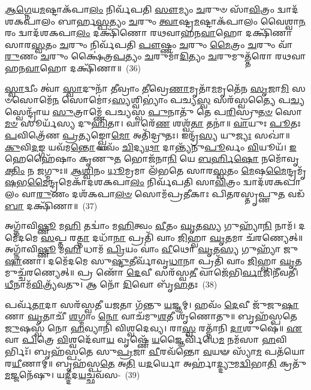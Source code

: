 {\anuvakamend[{\-\ul{𑌆}\-\-\ul{𑌗𑍍𑌨𑍇}\-𑌯𑍞 \ul{𑌸}\-𑌪𑍍𑌤𑌚᳴𑌤𑍍𑌵𑌾𑌰𑌿𑍞𑌶𑌤𑍍}]}%

\-\ul{𑌆}\-\-\ul{𑌗𑍍𑌨𑍇}\-𑌯\-\ul{𑌮}\-𑌷𑍍𑌟𑌾\-𑌕᳴𑌪𑌾\-\ul{𑌲𑌂} 𑌨𑌿𑌰𑍍𑌵᳴𑌪𑌤𑌿 \ul{𑌸𑍗}\-𑌮𑍍𑌯𑌂 \ul{𑌚}\-𑌰𑍁𑍞 𑌸𑌾᳴\-\ul{𑌵𑌿}\-𑌤𑍍𑌰𑌂 𑌦𑍍𑌵𑌾𑌦᳴𑌶\-𑌕𑌪𑌾𑌲𑌂 𑌬𑌾𑌰𑍍\mbox{}𑌹\-\ul{𑌸𑍍𑌪}\-𑌤𑍍𑌯𑌂 \ul{𑌚}\-𑌰𑍁𑌂 \ul{𑌤𑍍𑌵𑌾}\-𑌷𑍍𑌟𑍍𑌰\-\ul{𑌮}\-𑌷𑍍𑌟𑌾𑌕᳴𑌪𑌾𑌲𑌂 𑌵𑍈𑌶𑍍𑌵𑌾\-\ul{𑌨}\-𑌰𑌂 𑌦𑍍𑌵𑌾𑌦᳴𑌶\-𑌕𑌪𑌾\-\ul{𑌲𑌂} 𑌦𑌕𑍍𑌷𑌿᳴𑌣𑍋 𑌰𑌥𑌵𑌾𑌹𑌨\-\ul{𑌵𑌾}\-𑌹𑍋 𑌦𑌕𑍍𑌷𑌿᳴𑌣𑌾 𑌸𑌾𑌰\-\ul{𑌸𑍍𑌵}\-𑌤𑌂 \ul{𑌚}\-𑌰𑍁𑌂 𑌨𑌿𑌰𑍍𑌵᳴𑌪𑌤𑌿 \ul{𑌪𑍗}\-𑌷𑍍𑌣𑌂 \ul{𑌚}\-𑌰𑍁𑌂 \ul{𑌮𑍈}\-𑌤𑍍𑌰𑌂 \ul{𑌚}\-𑌰𑍁𑌂 𑌵𑌾᳴\-\ul{𑌰𑍁}\-𑌣𑌂 \ul{𑌚}\-𑌰𑍁𑌂 𑌕𑍍𑌷𑍈॑𑌤𑍍𑌰\-\ul{𑌪}\-𑌤𑍍𑌯𑌂 \ul{𑌚}\-𑌰𑍁𑌮𑌾᳴\-\ul{𑌦𑌿}\-𑌤𑍍𑌯𑌂 \ul{𑌚}\-𑌰𑍁𑌮𑍁𑌤𑍍𑌤᳴𑌰𑍋 𑌰𑌥𑌵𑌾𑌹𑌨\-\ul{𑌵𑌾}\-𑌹𑍋 𑌦𑌕𑍍𑌷𑌿᳴𑌣𑌾॥~(36)

{\anuvakamend[{\-\ul{𑌆}\-\-\ul{𑌗𑍍𑌨𑍇}\-𑌯𑌂 𑌚𑌤𑍁᳴𑌸𑍍𑌤𑍍𑌰𑌿𑍞𑌶𑌤𑍍}]}%

\-\ul{𑌸𑍍𑌵𑌾}\-𑌦𑍍𑌵𑍀𑌂 𑌤𑍍𑌵𑌾॑ \ul{𑌸𑍍𑌵𑌾}\-𑌦𑍁𑌨𑌾᳴ \ul{𑌤𑍀}\-𑌵𑍍𑌰𑌾𑌂 \ul{𑌤𑍀}\-𑌵𑍍𑌰𑍇\-\ul{𑌣𑌾}\-𑌮𑍃𑌤𑌾᳴\-\ul{𑌮}\-𑌮𑍃𑌤𑍇᳴𑌨 \ul{𑌸𑍃}\-𑌜𑌾\-\ul{𑌮𑌿} 𑌸𑍞𑌸𑍋𑌮𑍇᳴\-\ul{𑌨} 𑌸𑍋𑌮𑍋॑\-𑌽\-\ul{𑌸𑍍𑌯}\-𑌶𑍍𑌵𑌿\-𑌭𑍍𑌯𑌾𑌂॑ 𑌪𑌚𑍍𑌯\-\ul{𑌸𑍍𑌵} 𑌸𑌰᳴𑌸𑍍𑌵𑌤𑍍𑌯𑍈 𑌪\-\ul{𑌚𑍍𑌯}\-𑌸𑍍𑌵𑍇𑌨𑍍𑌦𑍍𑌰𑌾᳴𑌯 \ul{𑌸𑍁}\-𑌤𑍍𑌰𑌾𑌮𑍍𑌣𑍇᳴ 𑌪𑌚𑍍𑌯𑌸𑍍𑌵 \ul{𑌪𑍁}\-𑌨𑌾𑌤𑍁᳴ 𑌤𑍇 𑌪\-\ul{𑌰𑌿}\-𑌸𑍍𑌰𑍁\-\ul{𑌤}\-\-\ul{𑍞} 𑌸𑍋\-\ul{𑌮}\-\-\ul{𑍞} 𑌸𑍂𑌰𑍍𑌯᳴𑌸𑍍𑌯 𑌦𑍁\-\ul{𑌹𑌿}\-𑌤𑌾। 𑌵𑌾𑌰𑍇᳴\-\ul{𑌣} 𑌶𑌶𑍍𑌵᳴\-\ul{𑌤𑌾} 𑌤𑌨𑌾॑॥ \ul{𑌵𑌾}\-𑌯𑍁𑌃 \ul{𑌪𑍂}\-𑌤𑌃 \ul{𑌪}\-𑌵𑌿𑌤𑍍𑌰𑍇᳴𑌣 \ul{𑌪𑍍𑌰}\-𑌤𑍍𑌯𑌙𑍍𑌖𑍍𑌸𑍋\-\ul{𑌮𑍋} 𑌅𑌤𑌿᳴𑌦𑍍𑌰𑍁𑌤𑌃। 𑌇𑌨𑍍𑌦𑍍𑌰᳴\-\ul{𑌸𑍍𑌯} 𑌯𑍁\-\ul{𑌜𑍍𑌯𑌃} 𑌸𑌖𑌾॑॥ \ul{𑌕𑍁}\-𑌵𑌿\-\ul{𑌦}\-𑌙𑍍𑌗 𑌯𑌵᳴𑌮\-\ul{𑌨𑍍𑌤𑍋} 𑌯𑌵𑌂᳴ \ul{𑌚𑌿}\-𑌦𑍍𑌯\-\ul{𑌥𑌾} 𑌦𑌾𑌨𑍍𑌤𑍍𑌯᳴𑌨𑍁\-\ul{𑌪𑍂}\-𑌰𑍍𑌵𑌂 \ul{𑌵𑌿}\-𑌯𑍂𑌯᳴। \ul{𑌇}\-𑌹𑍇𑌹𑍈᳴𑌷𑌾𑌂 𑌕𑍃𑌣𑍁\-\ul{𑌤} 𑌭𑍋𑌜᳴𑌨𑌾\-\ul{𑌨𑌿} 𑌯𑍇 \ul{𑌬}\-\-\ul{𑌰𑍍}\-\mbox{}𑌹𑌿\-\ul{𑌷𑍋} 𑌨𑌮𑍋᳴𑌵𑍃\-\ul{𑌕𑍍𑌤𑌿𑌂} 𑌨 \ul{𑌜}\-𑌗𑍍𑌮𑍁𑌃॥ \ul{𑌆}\-\-\ul{𑌶𑍍𑌵𑌿}\-𑌨𑌂 \ul{𑌧𑍂}\-𑌮𑍍𑌰𑌮𑌾 𑌲᳴𑌭𑌤𑍇 𑌸𑌾𑌰\-\ul{𑌸𑍍𑌵}\-𑌤𑌂 \ul{𑌮𑍇}\-𑌷\-\ul{𑌮𑍈}\-𑌨𑍍𑌦𑍍𑌰𑌮𑍃᳴\-\ul{𑌷}\-𑌭\-\ul{𑌮𑍈}\-𑌨𑍍𑌦𑍍𑌰𑌮𑍇𑌕𑌾᳴\-𑌦𑌶\-𑌕𑌪𑌾\-\ul{𑌲𑌂} 𑌨𑌿𑌰𑍍𑌵᳴𑌪𑌤𑌿 𑌸𑌾\-\ul{𑌵𑌿}\-𑌤𑍍𑌰𑌂 𑌦𑍍𑌵𑌾𑌦᳴𑌶\-𑌕𑌪𑌾𑌲𑌂 𑌵𑌾\-\ul{𑌰𑍁}\-𑌣𑌂 𑌦𑌶᳴\-𑌕𑌪𑌾\-\ul{𑌲}\-\-\ul{𑍞} 𑌸𑍋𑌮᳴𑌪𑍍𑌰𑌤𑍀𑌕𑌾𑌃 𑌪𑌿𑌤𑌰𑌸𑍍𑌤𑍃𑌪𑍍𑌣𑍁\-\ul{𑌤} 𑌵𑌡᳴\-\ul{𑌬𑌾} 𑌦𑌕𑍍𑌷𑌿᳴𑌣𑌾॥~(37)

{\anuvakamend[{𑌭𑍋𑌜᳴𑌨𑌾\-\ul{𑌨𑌿} 𑌷𑌡𑍍𑌵𑌿𑍞᳴𑌶𑌤𑌿𑌶𑍍𑌚}]}%

𑌅𑌗𑍍𑌨𑌾᳴𑌵𑌿\-\ul{𑌷𑍍𑌣𑍂} 𑌮\-\ul{𑌹𑌿} 𑌤𑌦𑍍𑌵𑌾𑌂॑ 𑌮\-\ul{𑌹𑌿}\-𑌤𑍍𑌵𑌂 \ul{𑌵𑍀}\-𑌤𑌂 \ul{𑌘𑍃}\-𑌤\-\ul{𑌸𑍍𑌯} 𑌗𑍁𑌹𑍍𑌯𑌾᳴\-\ul{𑌨𑌿} 𑌨𑌾𑌮᳴। 𑌦𑌮𑍇᳴𑌦𑌮𑍇 \ul{𑌸}\-𑌪𑍍𑌤 𑌰\-\ul{𑌤𑍍𑌨𑌾} 𑌦𑌧𑌾᳴\-\ul{𑌨𑌾} 𑌪𑍍𑌰𑌤𑌿᳴ 𑌵𑌾𑌂 \ul{𑌜𑌿}\-𑌹𑍍𑌵𑌾 \ul{𑌘𑍃}\-𑌤𑌮𑌾 𑌚᳴𑌰𑌣𑍍𑌯𑍇𑌤𑍍॥ 𑌅𑌗𑍍𑌨𑌾᳴𑌵𑌿\-\ul{𑌷𑍍𑌣𑍂} 𑌮\-\ul{𑌹𑌿} 𑌧𑌾𑌮᳴ \ul{𑌪𑍍𑌰𑌿}\-𑌯𑌂 𑌵𑌾𑌂॑ \ul{𑌵𑍀}\-𑌥𑍋 \ul{𑌘𑍃}\-𑌤\-\ul{𑌸𑍍𑌯} 𑌗𑍁𑌹𑍍𑌯𑌾᳴ 𑌜𑍁\-\ul{𑌷𑌾}\-𑌣𑌾। 𑌦𑌮𑍇᳴𑌦𑌮𑍇 𑌸𑍁\-\ul{𑌷𑍍𑌟𑍁}\-𑌤𑍀𑌰𑍍𑌵𑌾᳴𑌵𑍃\-\ul{𑌧𑌾}\-𑌨𑌾 𑌪𑍍𑌰𑌤𑌿᳴ 𑌵𑌾𑌂 \ul{𑌜𑌿}\-𑌹𑍍𑌵𑌾 \ul{𑌘𑍃}\-𑌤𑌮𑍁𑌚𑍍𑌚᳴𑌰𑌣𑍍𑌯𑍇𑌤𑍍॥ 𑌪𑍍𑌰 𑌣𑍋᳴ \ul{𑌦𑍇}\-𑌵𑍀 𑌸𑌰᳴𑌸𑍍𑌵\-\ul{𑌤𑍀} 𑌵𑌾𑌜𑍇᳴𑌭𑌿\-\ul{𑌰𑍍𑌵𑌾}\-𑌜𑌿𑌨𑍀᳴𑌵𑌤𑍀। \ul{𑌧𑍀}\-𑌨𑌾𑌮᳴\-\ul{𑌵𑌿}\-𑌤𑍍𑌰𑍍𑌯᳴𑌵𑌤𑍁। 𑌆 𑌨𑍋᳴ \ul{𑌦𑌿}\-𑌵𑍋 𑌬𑍃᳴\-\ul{𑌹}\-𑌤𑌃~(38)

𑌪𑌰𑍍𑌵᳴\-\ul{𑌤𑌾}\-𑌦𑌾 𑌸𑌰᳴𑌸𑍍𑌵𑌤𑍀 𑌯\-\ul{𑌜}\-𑌤𑌾 𑌗᳴𑌨𑍍𑌤𑍁 \ul{𑌯}\-𑌜𑍍𑌞𑌮𑍍। 𑌹𑌵𑌂᳴ \ul{𑌦𑍇}\-𑌵𑍀 𑌜𑍁᳴𑌜𑍁\-\ul{𑌷𑌾}\-𑌣𑌾 \ul{𑌘𑍃}\-𑌤𑌾𑌚𑍀᳴ \ul{𑌶}\-𑌗𑍍𑌮𑌾𑌂 \ul{𑌨𑍋} 𑌵𑌾𑌚᳴𑌮𑍁\-\ul{𑌶}\-𑌤𑍀 𑌶𑍃᳴𑌣𑍋𑌤𑍁॥ 𑌬𑍃𑌹᳴𑌸𑍍𑌪𑌤𑍇 \ul{𑌜𑍁}\-𑌷𑌸𑍍𑌵᳴ 𑌨𑍋 \ul{𑌹}\-𑌵𑍍𑌯𑌾𑌨𑌿᳴ 𑌵𑌿𑌶𑍍𑌵𑌦𑍇𑌵𑍍𑌯। 𑌰𑌾\-\ul{𑌸𑍍𑌵} 𑌰𑌤𑍍𑌨𑌾᳴𑌨𑌿 \ul{𑌦𑌾}\-𑌶𑍁𑌷𑍇॑॥ \ul{𑌏}\-𑌵𑌾 \ul{𑌪𑌿}\-𑌤𑍍𑌰𑍇 \ul{𑌵𑌿}\-𑌶𑍍𑌵𑌦𑍇᳴𑌵𑌾\-\ul{𑌯} 𑌵𑍃𑌷𑍍𑌣𑍇᳴ \ul{𑌯}\-𑌜𑍍𑌞𑍈𑌰𑍍𑌵𑌿᳴𑌧𑍇\-\ul{𑌮} 𑌨𑌮᳴𑌸𑌾 \ul{𑌹}\-𑌵𑌿𑌰𑍍𑌭𑌿𑌃᳴। 𑌬𑍃𑌹᳴𑌸𑍍𑌪𑌤𑍇 𑌸𑍁\-\ul{𑌪𑍍𑌰}\-𑌜𑌾 \ul{𑌵𑍀}\-𑌰𑌵᳴𑌨𑍍𑌤𑍋 \ul{𑌵}\-𑌯𑍟 𑌸𑍍𑌯𑌾᳴\-\ul{𑌮} 𑌪𑌤᳴𑌯𑍋 𑌰\-\ul{𑌯𑍀}\-𑌣𑌾𑌮𑍍॥ 𑌬𑍃𑌹᳴𑌸𑍍𑌪\-\ul{𑌤𑍇} 𑌅\-\ul{𑌤𑌿} 𑌯\-\ul{𑌦}\-𑌰𑍍𑌯𑍋 𑌅𑌰𑍍\mbox{}𑌹𑌾॑\-\ul{𑌦𑍍𑌦𑍍𑌯𑍁}\-𑌮\-\ul{𑌦𑍍𑌵𑌿}\-𑌭𑌾\-\ul{𑌤𑌿} 𑌕𑍍𑌰𑌤𑍁᳴\-\ul{𑌮}\-𑌜𑍍𑌜𑌨𑍇᳴𑌷𑍁। 𑌯\-\ul{𑌦𑍍𑌦𑍀}\-𑌦\-\ul{𑌯}\-𑌚𑍍𑌛𑌵᳴𑌸-~(39)

